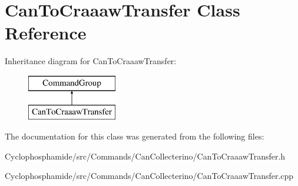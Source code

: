 \hypertarget{class_can_to_craaaw_transfer}{}\section{Can\+To\+Craaaw\+Transfer Class Reference}
\label{class_can_to_craaaw_transfer}
Inheritance diagram for Can\+To\+Craaaw\+Transfer\+:\begin{figure}[H]
\begin{center}
\leavevmode
\includegraphics[height=2.000000cm]{class_can_to_craaaw_transfer}
\end{center}
\end{figure}


The documentation for this class was generated from the following files\+:\begin{DoxyCompactItemize}
\item 
Cyclophosphamide/src/\+Commands/\+Can\+Collecterino/Can\+To\+Craaaw\+Transfer.\+h\item 
Cyclophosphamide/src/\+Commands/\+Can\+Collecterino/Can\+To\+Craaaw\+Transfer.\+cpp\end{DoxyCompactItemize}
